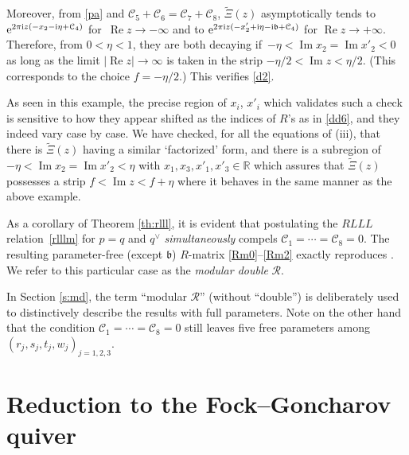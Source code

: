 \documentclass[pdftex]{sigma}
\newcommand{\R}{{\mathbb R}}
\newcommand{\bb}{{\mathfrak b}}
\newcommand{\e}{{\mathrm e}}
\numberwithin{equation}{section}
\begin{document}
Moreover, from \eqref{pa} and $\mathcal{C}_5+\mathcal{C}_6=\mathcal{C}_7+\mathcal{C}_8$,
${\tilde \Xi}(z)$ asymptotically tends to
$\e^{2\pi {\rm i} z(-x_2-{\rm i}\eta+\mathcal{C}_4)}$ for~${\mathop{\operatorname{Re}}z \rightarrow -\infty}$
and to
$\e^{2\pi {\rm i} z(-x'_2+{\rm i}\eta-{\rm i} \bb +\mathcal{C}_4)}$ for $\mathop{\operatorname{Re}}z \rightarrow +\infty$.
Therefore, from $0<\eta<1$, they are both decaying if~${-\eta < \operatorname{Im} x_2 = \operatorname{Im}x'_2<0}$ as long as the limit
$|\mathop{\operatorname{Re}}z| \rightarrow \infty$ is taken in the strip
$-\eta/2 < \operatorname{Im}z < \eta/2$.
(This corresponds to the choice $f=-\eta/2$.)
This verifies \eqref{d2}.

As seen in this example,
the precise region of $x_i$, $x'_i$ which validates such a check
is sensitive to how they appear shifted as the indices of $R$'s
as in \eqref{dd6}, and they indeed vary case by case.
We have checked, for all the equations of (iii), that
there is ${\tilde \Xi}(z)$ having a similar `factorized' form, and
there is a subregion of $-\eta < \operatorname{Im} x_2 = \operatorname{Im}x'_2< \eta$
with $x_1,x_3, x'_1, x'_3 \in \R$ which assures that
${\tilde \Xi}(z)$ possesses a strip $f< \operatorname{Im} z < f+\eta$
where it behaves in the same manner as the above example.





\begin{Remark}\label{re:bms}
 As a corollary of Theorem \ref{th:rlll}, it is evident that
 postulating the $RLLL$ relation~\eqref{rlllm} for $p=q$ and
 $q^\vee$ \emph{simultaneously} compels
 ${\mathcal C}_1 = \dotsb = {\mathcal C}_8=0$. The resulting
 parameter-free (except $\bb$) $R$-matrix \eqref{Rm0}--\eqref{Rm2}
 exactly reproduces \cite[equation~(51)]{BMS10}. We refer to this
 particular case as the {\em modular double} $\mathcal{R}$.
\end{Remark}

In Section \ref{s:md}, the term ``modular $\mathcal{R}$'' (without
``double'') is deliberately used to distinctively describe the results
with full parameters.
%
Note on the other hand that the condition
${\mathcal C}_1 = \dotsb = {\mathcal C}_8=0$ still leaves five free
parameters among $(r_j,s_j,t_j,w_j)_{j=1,2,3}$.

\section{Reduction to the Fock--Goncharov quiver}\label{s:red}
\end{document}
